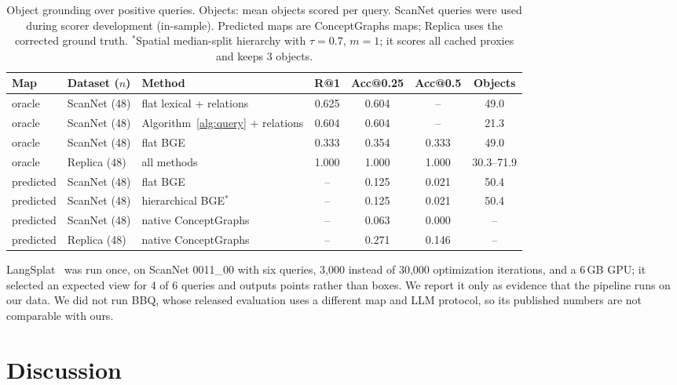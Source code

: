 \documentclass{ieeeaccess}
\begin{document}
\begin{table}[!t]
\centering
\caption{Object grounding over positive queries. Objects: mean objects scored per
query. ScanNet queries were used during scorer development (in-sample). Predicted
maps are ConceptGraphs maps; Replica uses the corrected ground truth.
$^\ast$Spatial median-split hierarchy with $\tau=0.7$, $m=1$; it scores all cached
proxies and keeps 3 objects.}
\label{tab:objects}
\footnotesize
\begin{tabular}{lllcccc}
\toprule
Map & Dataset ($n$) & Method & R@1 & Acc@0.25 & Acc@0.5 & Objects \\
\midrule
oracle & ScanNet (48) & flat lexical + relations & 0.625 & 0.604 & -- & 49.0 \\
oracle & ScanNet (48) & Algorithm~\ref{alg:query} + relations & 0.604 & 0.604 & -- & 21.3 \\
oracle & ScanNet (48) & flat BGE & 0.333 & 0.354 & 0.333 & 49.0 \\
oracle & Replica (48) & all methods & 1.000 & 1.000 & 1.000 & 30.3--71.9 \\
\midrule
predicted & ScanNet (48) & flat BGE & -- & 0.125 & 0.021 & 50.4 \\
predicted & ScanNet (48) & hierarchical BGE$^\ast$ & -- & 0.125 & 0.021 & 50.4 \\
predicted & ScanNet (48) & native ConceptGraphs & -- & 0.063 & 0.000 & -- \\
predicted & Replica (48) & native ConceptGraphs & -- & 0.271 & 0.146 & -- \\
\bottomrule
\end{tabular}
\end{table}

LangSplat~\cite{langsplat2024} was run once, on ScanNet 0011\_00 with six
queries, 3,000 instead of 30,000 optimization iterations, and a 6\,GB GPU; it
selected an expected view for 4 of 6 queries and outputs points rather than boxes.
We report it only as evidence that the pipeline runs on our data. We did not run
BBQ, whose released evaluation uses a different map and LLM protocol, so its
published numbers are not comparable with ours.

\section{Discussion}
\label{sec:discussion}
\end{document}

